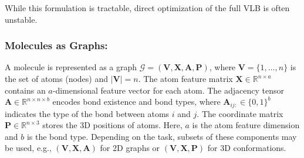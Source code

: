 \noindent While this formulation is tractable, direct optimization of the full VLB is often unstable.

\subsubsection{Molecules as Graphs:} \label{MAG}A molecule is represented as a graph
$\mathcal{G} = (\mathbf{V}, \mathbf{X}, \mathbf{A}, \mathbf{P})$, 
where $\mathbf{V} = \{1, \dots, n\}$ is the set of atoms (nodes) and $|\mathbf{V}| = n$.
The atom feature matrix $\mathbf{X} \in \mathbb{R}^{n \times a}$ contains
an $a$-dimensional feature vector for each atom.
The adjacency tensor $\mathbf{A} \in \mathbb{R}^{n \times n \times b}$
encodes bond existence and bond types, where
$\mathbf{A}_{ij:} \in \{0,1\}^b$ indicates the type of the bond between atoms $i$ and $j$.
The coordinate matrix $\mathbf{P} \in \mathbb{R}^{n \times 3}$ stores the 3D
positions of atoms.
Here, $a$ is the atom feature dimension and $b$ is the bond type.
Depending on the task, subsets of these components may be used, e.g.,
$(\mathbf{V}, \mathbf{X}, \mathbf{A})$ for 2D graphs or $(\mathbf{V}, \mathbf{X}, \mathbf{P})$
for 3D conformations.